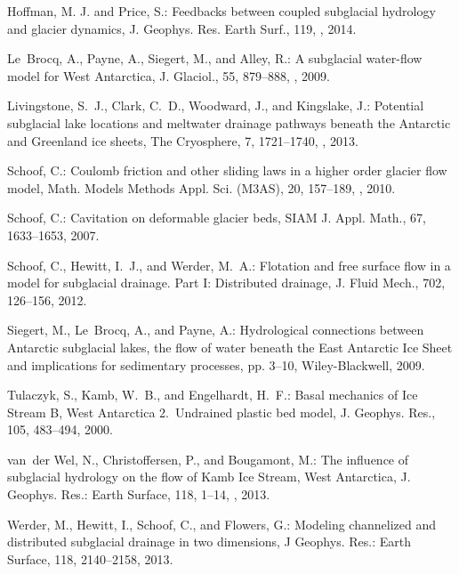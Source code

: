 \documentclass[11pt,reqno]{amsart}
\begin{document}
\begin{thebibliography}{}
Hoffman, M. J. and Price, S.: Feedbacks between coupled subglacial hydrology and glacier dynamics, J. Geophys. Res. Earth Surf., 119, , 2014.
  
Le~Brocq, A., Payne, A., Siegert, M., and Alley, R.: A subglacial water-flow
  model for {W}est {A}ntarctica, J. Glaciol., 55, 879--888,
  , 2009.

Livingstone, S.~J., Clark, C.~D., Woodward, J., and Kingslake, J.: Potential
  subglacial lake locations and meltwater drainage pathways beneath the
  {A}ntarctic and {G}reenland ice sheets, The Cryosphere, 7, 1721--1740,
  , 2013.

Schoof, C.: Coulomb friction and other sliding laws in a higher order glacier
  flow model, Math. Models Methods Appl. Sci. (M3AS), 20, 157--189,
  , 2010{}.

Schoof, C.: Cavitation on deformable glacier beds, SIAM J. Appl. Math., 67,
  1633--1653, 2007.

Schoof, C., Hewitt, I.~J., and Werder, M.~A.: Flotation and free surface flow
  in a model for subglacial drainage. {P}art {I}: {D}istributed drainage, J.
  Fluid Mech., 702, 126--156, 2012.

Siegert, M., Le~Brocq, A., and Payne, A.: Hydrological connections between
  Antarctic subglacial lakes, the flow of water beneath the East Antarctic Ice
  Sheet and implications for sedimentary processes, pp. 3--10, Wiley-Blackwell,
  2009.

Tulaczyk, S., Kamb, W.~B., and Engelhardt, H.~F.: Basal mechanics of {I}ce
  {S}tream {B}, {W}est {A}ntarctica 2.~{U}ndrained plastic bed model, J.
  Geophys. Res., 105, 483--494, 2000{}.

van~der Wel, N., Christoffersen, P., and Bougamont, M.: The influence of
  subglacial hydrology on the flow of {K}amb {I}ce {S}tream, {W}est
  {A}ntarctica, J. Geophys. Res.: Earth Surface, 118, 1--14,
  , 2013.

Werder, M., Hewitt, I., Schoof, C., and Flowers, G.: Modeling channelized and
  distributed subglacial drainage in two dimensions, J Geophys. Res.: Earth
  Surface, 118, 2140--2158, 2013.
\end{thebibliography}
\end{document}
